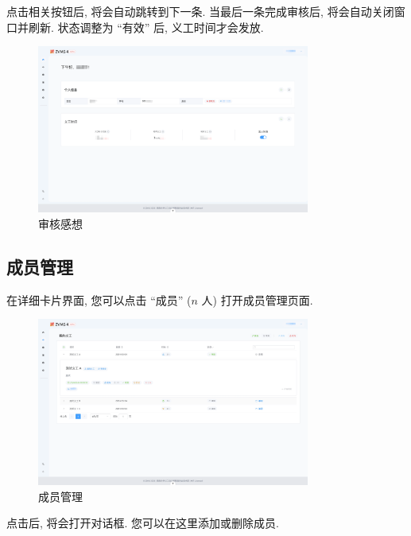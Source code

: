 \documentclass{article}
\begin{document}
点击相关按钮后, 将会自动跳转到下一条. 当最后一条完成审核后, 将会自动关闭窗口并刷新. 状态调整为 ``有效'' 后, 义工时间才会发放.

\begin{figure}[H]
  \centering
  \includegraphics[width=0.8\textwidth]{../assets/image-20240303161949915.png}
  \caption{审核感想}
  \label{fig:volunteer-feelings-audit-finish}
\end{figure}

\subsection{成员管理}

在详细卡片界面, 您可以点击 ``成员'' ($n$ 人) 打开成员管理页面.

\begin{figure}[H]
  \centering
  \includegraphics[width=0.8\textwidth]{../assets/image-20240303164247303.png}
  \caption{成员管理}
  \label{fig:volunteer-member}
\end{figure}

点击后, 将会打开对话框. 您可以在这里添加或删除成员.
\end{document}
